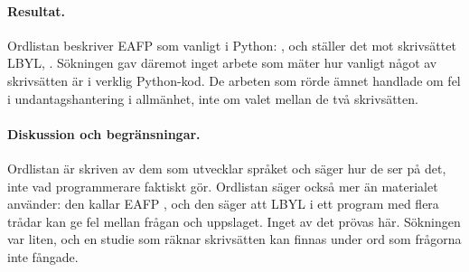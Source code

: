 
\paragraph{Resultat.}  Ordlistan beskriver EAFP som vanligt i Python:
, och ställer det mot skrivsättet LBYL,
.
Sökningen gav däremot inget arbete som mäter hur vanligt något av
skrivsätten är i verklig Python-kod.  De arbeten som rörde ämnet
handlade om fel i undantagshantering i allmänhet, inte om valet mellan
de två skrivsätten.

\paragraph{Diskussion och begränsningar.}  Ordlistan är skriven av dem
som utvecklar språket och säger hur de ser på det, inte vad
programmerare faktiskt gör.  Ordlistan säger också mer än materialet
använder: den kallar EAFP ,
och den säger att LBYL i ett program med flera trådar kan ge fel mellan
frågan och uppslaget.  Inget av det prövas här.  Sökningen var liten,
och en studie som räknar skrivsätten kan finnas under ord som frågorna
inte fångade.

